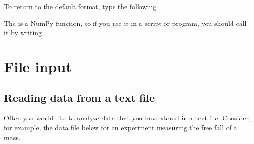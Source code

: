 \documentclass[letterpaper,10pt,english]{sphinxmanual}
\begin{document}
\begin{sphinxVerbatim}[commandchars=\\\{\}]
\end{sphinxVerbatim}

\sphinxAtStartPar
To return to the default format, type the following

\begin{sphinxVerbatim}[commandchars=\\\{\}]
\PYG{g+go}{[  3.           5.66666667   8.33333333  11.}
\PYG{g+go}{   13.66666667  16.33333333  19.        ]}
\end{sphinxVerbatim}

\sphinxAtStartPar
The  is a NumPy function, so if you use it in a script or program, you should call it by writing .

\ignorespaces 

\section{File input}
\label{\detokenize{chap4/chap4_io:file-input}}\label{\detokenize{chap4/chap4_io:index-4}}

\subsection{Reading data from a text file}
\label{\detokenize{chap4/chap4_io:reading-data-from-a-text-file}}
\sphinxAtStartPar
Often you would like to analyze data that you have stored in a text file.  Consider, for example, the data file below for an experiment measuring the free fall of a mass.
\end{document}
